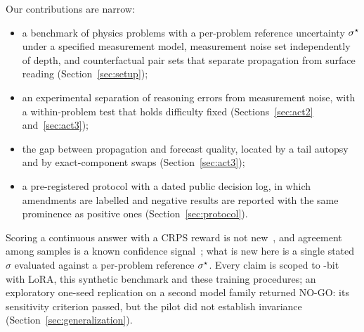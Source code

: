 Our contributions are narrow:
\begin{itemize}[leftmargin=*,itemsep=2pt]
  \item a benchmark of physics problems with a per-problem reference uncertainty $\sigma^{\star}$ under a specified measurement
  model, measurement noise set independently of
  depth, and counterfactual pair sets that separate propagation from surface reading (Section~\ref{sec:setup});
  \item an experimental separation of reasoning errors from measurement noise, with a within-problem test that holds
  difficulty fixed (Sections~\ref{sec:act2} and~\ref{sec:act3});
  \item the gap between propagation and forecast quality, located by a tail autopsy and by exact-component swaps
  (Section~\ref{sec:act3});
  \item a pre-registered protocol with a dated public decision log, in which amendments are labelled and negative
  results are reported with the same prominence as positive ones (Section~\ref{sec:protocol}).
\end{itemize}
Scoring a continuous answer with a CRPS reward is not new~\citep{park2026dar}, and agreement among samples is a known
confidence signal~\citep{wang2023selfconsistency}; what is new here is a single stated $\sigma$ evaluated against a
per-problem reference $\sigma^{\star}$.
Every claim is scoped to -bit  with LoRA, this synthetic benchmark and these training
procedures; an exploratory one-seed replication on a second model family returned NO-GO: its sensitivity
criterion passed, but the pilot did not establish invariance (Section~\ref{sec:generalization}).

